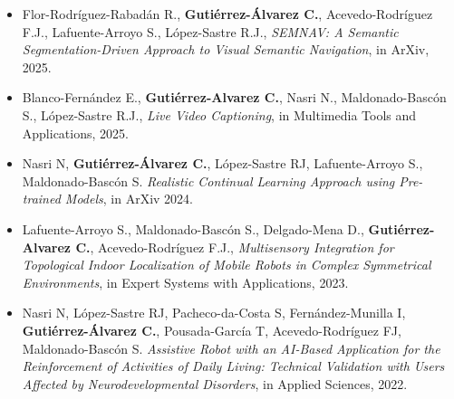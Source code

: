 \begin{itemize}
    \item Flor-Rodríguez-Rabadán R., \textbf{Gutiérrez-Álvarez C.}, Acevedo-Rodríguez F.J., Lafuente-Arroyo S., López-Sastre R.J., \textit{SEMNAV: A Semantic Segmentation-Driven Approach to Visual Semantic Navigation}, in ArXiv, 2025.
    \item Blanco-Fernández E., \textbf{Gutiérrez-Alvarez C.}, Nasri N., Maldonado-Bascón S., López-Sastre R.J., \textit{Live Video Captioning}, in Multimedia Tools and Applications, 2025.
    \item Nasri N, \textbf{Gutiérrez-Álvarez C.}, López-Sastre RJ, Lafuente-Arroyo S., Maldonado-Bascón S. \textit{Realistic Continual Learning Approach using Pre-trained Models}, in ArXiv 2024.
    \item Lafuente-Arroyo S., Maldonado-Bascón S., Delgado-Mena D., \textbf{Gutiérrez-Alvarez C.}, Acevedo-Rodríguez F.J., \textit{Multisensory Integration for Topological Indoor Localization of Mobile Robots in Complex Symmetrical Environments}, in Expert Systems with Applications, 2023.
    \item Nasri N, López-Sastre RJ, Pacheco-da-Costa S, Fernández-Munilla I, \textbf{Gutiérrez-Álvarez C.}, Pousada-García T, Acevedo-Rodríguez FJ, Maldonado-Bascón S. \textit{Assistive Robot with an AI-Based Application for the Reinforcement of Activities of Daily Living: Technical Validation with Users Affected by Neurodevelopmental Disorders}, in Applied Sciences, 2022.
\end{itemize}